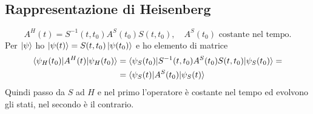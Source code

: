 \subsection{Rappresentazione di Heisenberg}
\[
A^H(t) = S^{-1}(t, t_0) A^S(t_0) S(t, t_0), \quad A^S(t_0) \text{ costante nel tempo.}
\]
Per \( \ket{\psi} \) ho \( \ket{\psi(t)} = S(t, t_0) \ket{\psi(t_0)} \) e ho elemento di matrice
\begin{align*}
\braket{\psi_H(t_0)|A^H(t)|\psi_H(t_0)} &= \braket{\psi_S(t_0)|S^{-1}(t, t_0) A^S(t_0) S(t, t_0)|\psi_S(t_0)} = \\
&= \braket{\psi_S(t)|A^S(t_0)|\psi_S(t)}
\end{align*}
Quindi passo da \( S \) ad \( H \) e nel primo l'operatore è costante nel tempo ed evolvono gli stati, nel secondo è il contrario.

